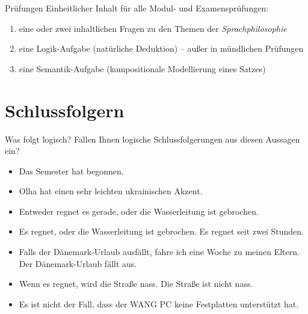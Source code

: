 \begin{frame}
  {Prüfungen}
  \onslide<+->
  \onslide<+->
  Einheitlicher Inhalt für alle Modul- und Examensprüfungen:\\
  \Zeile
  \begin{enumerate}[<+->]
    \item eine oder zwei inhaltlichen Fragen zu den Themen der \textit{Sprachphilosophie}\\
    \item eine Logik-Aufgabe (natürliche Deduktion) -- \alert{außer in mündlichen Prüfungen}
    \item eine Semantik-Aufgabe (kompositionale Modellierung eines Satzes)
  \end{enumerate}
  \Zeile
  \onslide<+->
\end{frame}

\section{Schlussfolgern}

\begin{frame}
  {Was folgt logisch?}
  \onslide<+->
  \onslide<+->
  Fallen Ihnen logische Schlussfolgerungen aus diesen Aussagen ein?\\
  \Halbzeile
  \begin{itemize}[<+->]
    \item Das Semester hat begonnen.
    \item Olha hat einen sehr leichten ukrainischen Akzent.
    \item Entweder regnet es gerade, oder die Wasserleitung ist gebrochen.
    \item Es regnet, oder die Wasserleitung ist gebrochen. Es regnet seit zwei Stunden.
    \item Falls der Dänemark-Urlaub ausfällt, fahre ich eine Woche zu meinen Eltern.\\
      Der Dänemark-Urlaub fällt aus.
    \item Wenn es regnet, wird die Straße nass. Die Straße ist nicht nass.
    \item Es ist nicht der Fall, dass der WANG PC keine Festplatten unterstützt hat.
  \end{itemize}
\end{frame}

